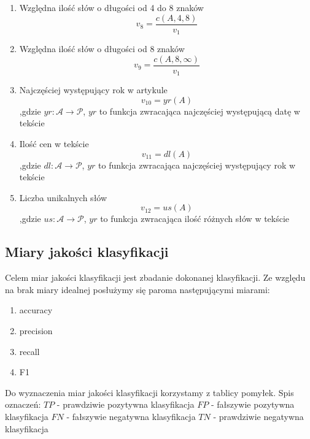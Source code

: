 \documentclass{classrep}
\begin{document}
\begin{enumerate}
\item Względna ilość słów o długości od 4 do 8 znaków
\begin{equation}
v_{8}=\frac{c(A,4,8)}{v_1}\label{eq:eps}
\end{equation}


\item Względna ilość słów o długości od 8 znaków
\begin{equation}
v_{9}=\frac{c(A,8,\infty)}{v_1}\label{eq:eps}
\end{equation}

\item Najczęściej występujący rok w artykule
\begin{equation}
v_{10}=yr(A)\label{eq:eps}
\end{equation}
,gdzie
\newline $yr:\mathcal{A}\rightarrow\mathcal{P}$, $yr$ to funkcja zwracająca najczęściej występującą datę w tekście


\item Ilość cen w tekście
\begin{equation}
v_{11}=dl(A)\label{eq:eps}
\end{equation}
,gdzie
\newline $dl:\mathcal{A}\rightarrow\mathcal{P}$, $yr$ to funkcja zwracająca najczęściej występujący rok w tekście


\item Liczba unikalnych słów
\begin{equation}
v_{12}=us(A)\label{eq:eps}
\end{equation}
,gdzie
\newline $us:\mathcal{A}\rightarrow\mathcal{P}$, $yr$ to funkcja zwracająca ilość różnych słów w tekście
\end{enumerate}

\subsection{Miary jakości klasyfikacji}
Celem miar jakości klasyfikacji jest zbadanie dokonanej klasyfikacji. Ze względu na brak miary idealnej posłużymy się paroma następującymi miarami:
\begin{enumerate}
\item{accuracy}
\item{precision}
\item{recall}
\item{F1}
\end{enumerate}
Do wyznaczenia miar jakości klasyfikacji korzystamy z tablicy pomyłek. Spis oznaczeń:
\newline $TP$ - prawdziwie pozytywna klasyfikacja
\newline $FP$ - fałszywie pozytywna klasyfikacja
\newline $FN$ - fałszywie negatywna klasyfikacja
\newline $TN$ - prawdziwie negatywna klasyfikacja
\end{document}

